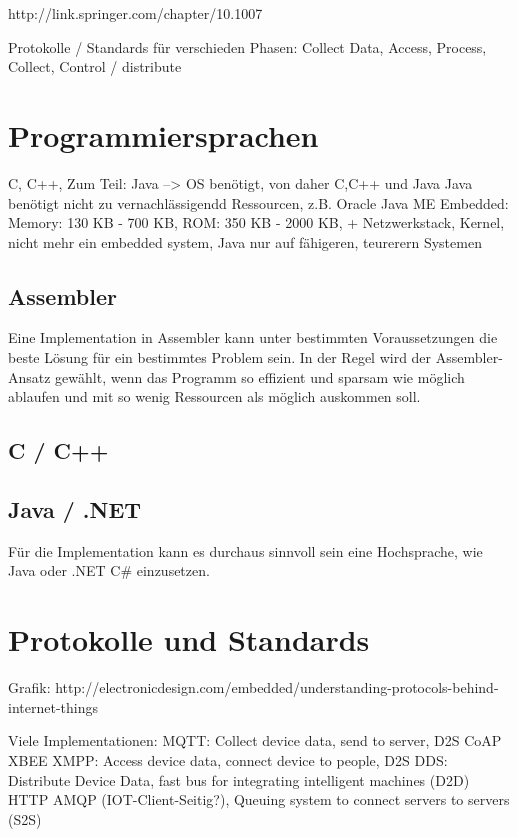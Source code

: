 http://link.springer.com/chapter/10.1007%


Protokolle / Standards für verschieden Phasen: Collect Data, Access, Process, Collect, Control / distribute

\section{Programmiersprachen}

C, C++, Zum Teil: Java --> OS benötigt, von daher C,C++ und Java
Java benötigt nicht zu vernachlässigendd Ressourcen, z.B. Oracle Java ME Embedded: Memory: 130 KB - 700 KB, ROM: 350 KB - 2000 KB, + Netzwerkstack, Kernel, nicht mehr ein embedded system, Java nur auf fähigeren, teurerern Systemen

\subsection{Assembler}
Eine Implementation in Assembler kann unter bestimmten Voraussetzungen die beste Lösung für ein bestimmtes Problem sein. In der Regel wird der Assembler-Ansatz gewählt, wenn das Programm so effizient und sparsam wie möglich ablaufen und mit so wenig Ressourcen als möglich auskommen soll.



\subsection{C / C++}


\subsection{Java / .NET}
Für die Implementation kann es durchaus sinnvoll sein eine Hochsprache, wie Java oder .NET C\# einzusetzen. 

\section{Protokolle und Standards}

Grafik: http://electronicdesign.com/embedded/understanding-protocols-behind-internet-things 

Viele Implementationen:
MQTT: Collect device data, send to server, D2S
CoAP
XBEE
XMPP: Access device data, connect device to people, D2S
DDS: Distribute Device Data, fast bus for integrating intelligent machines (D2D)
HTTP
AMQP (IOT-Client-Seitig?), Queuing system to connect servers to servers (S2S)


